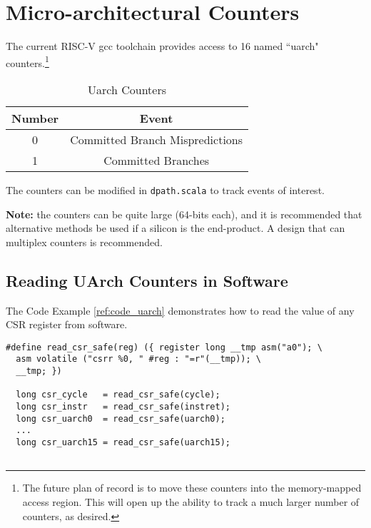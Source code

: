 \chapter{Micro-architectural Counters}

The current RISC-V gcc toolchain provides access to 16 named ``uarch" counters.\footnote{The future plan of record is to move these counters into the memory-mapped access region. This will open up the ability to track a much larger number of counters, as desired.}

\begin{table}[htp]
\caption{Uarch Counters}
\begin{center}
\begin{tabular}{|c|c|}
\hline
Number & Event \\
\hline
\hline
0 & Committed Branch Mispredictions \\
\hline
1 & Committed Branches \\
\hline
\end{tabular}
\end{center}
\label{table:uarchcounters}
\end{table}%

The counters can be modified in {\tt dpath.scala} to track events of interest.

{\bf Note:} the counters can be quite large (64-bits each), and it is recommended that alternative methods be used if a silicon is the end-product. A design that can multiplex counters is recommended. 

\section{Reading UArch Counters in Software}

The Code Example \ref{ref:code_uarch} demonstrates how to read the value of any CSR register from software.
  
  
\begin{center}
\begin{minipage}{0.66\textwidth}
\begin{lstlisting}[caption=Reading a CSR register]
#define read_csr_safe(reg) ({ register long __tmp asm("a0"); \   
  asm volatile ("csrr %0, " #reg : "=r"(__tmp)); \               
  __tmp; })             
  
  long csr_cycle   = read_csr_safe(cycle);
  long csr_instr   = read_csr_safe(instret);
  long csr_uarch0  = read_csr_safe(uarch0);
  ...
  long csr_uarch15 = read_csr_safe(uarch15);
  
\end{lstlisting}\label{ref:code_uarch}
\end{minipage}
\end{center}


